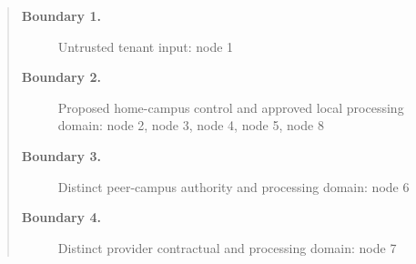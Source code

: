 \documentclass[11pt]{article}
\begin{document}
\begin{quote}
\begin{description}
\item[\textbf{Boundary 1.}] Untrusted tenant input: node 1
\item[\textbf{Boundary 2.}] Proposed home-campus control and approved local processing domain: node 2, node 3, node 4, node 5, node 8
\item[\textbf{Boundary 3.}] Distinct peer-campus authority and processing domain: node 6
\item[\textbf{Boundary 4.}] Distinct provider contractual and processing domain: node 7
\end{description}
\par{}
\end{quote}
\end{document}
